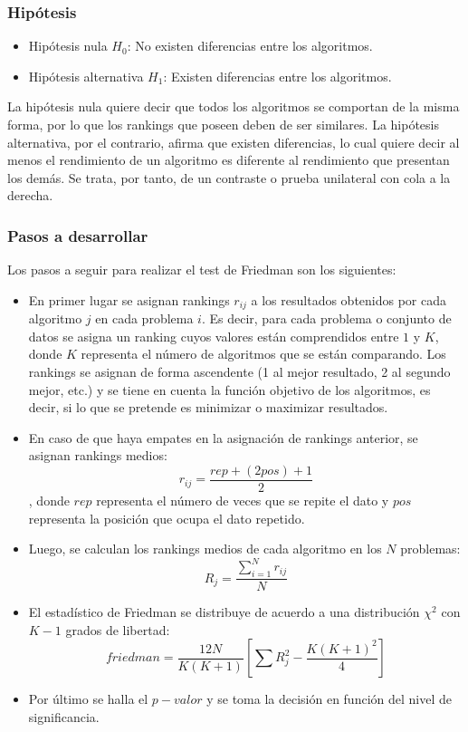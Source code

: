 \subsubsection{Hipótesis}
\begin{itemize}
\item Hipótesis nula $H_0$: No existen diferencias entre los algoritmos.
\item Hipótesis alternativa $H_1$: Existen diferencias entre los algoritmos.
\end{itemize}
La hipótesis nula quiere decir que todos los algoritmos se comportan de la misma forma, por lo que los rankings
que poseen deben de ser similares. La hipótesis alternativa, por el contrario, afirma que existen diferencias,
lo cual quiere decir al menos el rendimiento de un algoritmo es diferente al rendimiento que presentan los demás.
Se trata, por tanto, de un contraste o prueba unilateral con cola a la derecha.

\subsubsection{Pasos a desarrollar}
Los pasos a seguir para realizar el test de Friedman son los siguientes:
\begin{itemize}
\item En primer lugar se asignan rankings $r_{ij}$ a los resultados obtenidos por cada algoritmo $j$ en cada
problema $i$. Es decir, para cada problema o conjunto de datos se asigna un ranking cuyos valores están
comprendidos entre $1$ y $K$, donde $K$ representa el número de algoritmos que se están comparando. Los rankings
se asignan de forma ascendente (1 al mejor resultado, 2 al segundo mejor, etc.) y se tiene en cuenta la función
objetivo de los algoritmos, es decir, si lo que se pretende es minimizar o maximizar resultados.
\item En caso de que haya empates en la asignación de rankings anterior, se asignan rankings medios:
\[ r_{ij} = \frac{rep + (2pos) + 1}{2} \]
, donde $rep$ representa el número de veces que se repite el dato y $pos$ representa la posición que ocupa
el dato repetido.
\item Luego, se calculan los rankings medios de cada algoritmo en los $N$ problemas:
\[ R_j = \frac{\sum_{i=1}^{N} r_{ij}}{N} \]
\item El estadístico de Friedman se distribuye de acuerdo a una distribución $\chi^2$ con $K-1$ grados de
libertad:
\[ friedman = \frac{12N}{K(K+1)} \left[\sum R_j^2 - \frac{K(K+1)^2}{4} \right] \]
\item Por último se halla el $p-valor$ y se toma la decisión en función del nivel de significancia.
\end{itemize}

